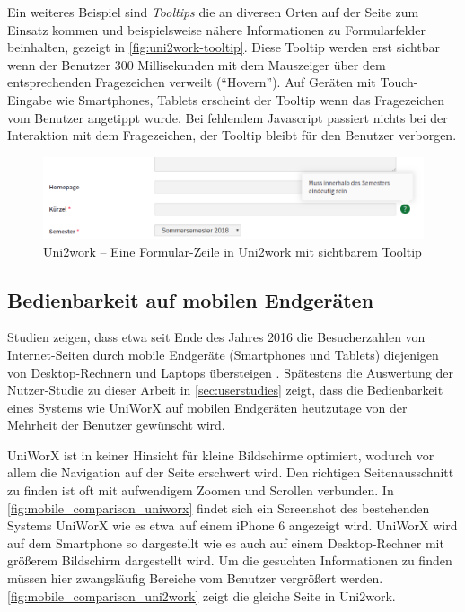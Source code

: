 \documentclass[11pt,a4paper,twoside,ngerman]{article}
\begin{document}
\noindent
Ein weiteres Beispiel sind \textit{Tooltips} die an diversen Orten auf der Seite zum Einsatz kommen und beispielsweise nähere Informationen zu Formularfelder beinhalten, gezeigt in \autoref{fig:uni2work-tooltip}. Diese Tooltip werden erst sichtbar wenn der Benutzer 300 Millisekunden mit dem Mauszeiger über dem entsprechenden Fragezeichen verweilt ("`Hovern"'). Auf Geräten mit Touch-Eingabe wie Smartphones, Tablets erscheint der Tooltip wenn das Fragezeichen vom Benutzer angetippt wurde. Bei fehlendem Javascript passiert nichts bei der Interaktion mit dem Fragezeichen, der Tooltip bleibt für den Benutzer verborgen.

\begin{figure}[H]
    \centering
    \includegraphics[width=\textwidth]{images/tooltip.png}
    \caption{Uni2work -- Eine Formular-Zeile in Uni2work mit sichtbarem Tooltip}
    \label{fig:uni2work-tooltip}
\end{figure}

\subsection{Bedienbarkeit auf mobilen Endgeräten}
Studien zeigen, dass etwa seit Ende des Jahres 2016 die Besucherzahlen von Internet-Seiten durch mobile Endgeräte (Smartphones und Tablets) diejenigen von Desktop-Rechnern und Laptops übersteigen \cite{web:stonetemple-mobile,web:statcounter-mobile}. Spätestens die Auswertung der Nutzer-Studie zu dieser Arbeit in \autoref{sec:userstudies} zeigt, dass die Bedienbarkeit eines Systems wie UniWorX auf mobilen Endgeräten heutzutage von der Mehrheit der Benutzer gewünscht wird.

UniWorX ist in keiner Hinsicht für kleine Bildschirme optimiert, wodurch vor allem die Navigation auf der Seite erschwert wird. Den richtigen Seitenausschnitt zu finden ist oft mit aufwendigem Zoomen und Scrollen verbunden. In \autoref{fig:mobile_comparison_uniworx} findet sich ein Screenshot des bestehenden Systems UniWorX wie es etwa auf einem iPhone 6 angezeigt wird. UniWorX wird auf dem Smartphone so dargestellt wie es auch auf einem Desktop-Rechner mit größerem Bildschirm dargestellt wird. Um die gesuchten Informationen zu finden müssen hier zwangsläufig Bereiche vom Benutzer vergrößert werden.
\autoref{fig:mobile_comparison_uni2work} zeigt die gleiche Seite in Uni2work.
\end{document}
